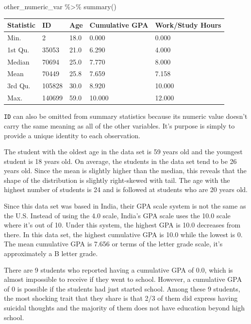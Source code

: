 \documentclass[
  letterpaper,
  DIV=11,
  numbers=noendperiod]{scrartcl}
\newenvironment{Shaded}{\begin{snugshade}}{\end{snugshade}}
\newcommand{\FunctionTok}[1]{\textcolor[rgb]{0.28,0.35,0.67}{#1}}
\newcommand{\NormalTok}[1]{\textcolor[rgb]{0.00,0.23,0.31}{#1}}
\newcommand{\SpecialCharTok}[1]{\textcolor[rgb]{0.37,0.37,0.37}{#1}}
\begin{document}
\begin{Shaded}
\begin{Highlighting}[numbers=left,,]
\NormalTok{other\_numeric\_var }\SpecialCharTok{\%\textgreater{}\%} \FunctionTok{summary}\NormalTok{()}
\end{Highlighting}
\end{Shaded}

\begin{longtable}[]{@{}lllll@{}}
\toprule\noalign{}
Statistic & ID & Age & Cumulative GPA & Work/Study Hours \\
\midrule\noalign{}
\endhead
\bottomrule\noalign{}
\endlastfoot
Min. & 2 & 18.0 & 0.000 & 0.000 \\
1st Qu. & 35053 & 21.0 & 6.290 & 4.000 \\
Median & 70694 & 25.0 & 7.770 & 8.000 \\
Mean & 70449 & 25.8 & 7.659 & 7.158 \\
3rd Qu. & 105828 & 30.0 & 8.920 & 10.000 \\
Max. & 140699 & 59.0 & 10.000 & 12.000 \\
\end{longtable}

\texttt{ID} can also be omitted from summary statistics because its
numeric value doesn't carry the same meaning as all of the other
variables. It's purpose is simply to provide a unique identity to each
observation.

The student with the oldest age in the data set is 59 years old and the
youngest student is 18 years old. On average, the students in the data
set tend to be 26 years old. Since the mean is slightly higher than the
median, this reveals that the shape of the distribution is slightly
right-skewed with tail. The age with the highest number of students is
24 and is followed at students who are 20 years old.

Since this data set was based in India, their GPA scale system is not
the same as the U.S. Instead of using the 4.0 scale, India's GPA scale
uses the 10.0 scale where it's out of 10. Under this system, the highest
GPA is 10.0 decreases from there. In this data set, the highest
cumulative GPA is 10.0 while the lowest is 0. The mean cumulative GPA is
7.656 or terms of the letter grade scale, it's approximately a B letter
grade.

There are 9 students who reported having a cumulative GPA of 0.0, which
is almost impossible to receive if they went to school. However, a
cumulative GPA of 0 is possible if the students had just started school.
Among these 9 students, the most shocking trait that they share is that
2/3 of them did express having suicidal thoughts and the majority of
them does not have education beyond high school.
\end{document}
